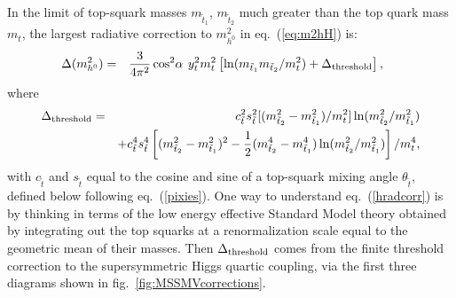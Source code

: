 \documentclass[12pt]{article}
\def\beq{\begin{eqnarray}}
\def\eeq{\end{eqnarray}}
\def\stilde{\widetilde}
\def\half{{1\over 2}}
\begin{document}
In the limit of top-squark
masses $m_{\stilde t_1}$, $m_{\stilde t_2}$ much greater than the top 
quark mass $m_t$, the largest radiative correction 
to $m_{h^0}^2$ in eq.~(\ref{eq:m2hH}) is:
\beq
\Delta (m^2_{h^0}) &=&
{3\over 4 \pi^2} \cos^2\!\alpha\>\, y_t^2 m_t^2
\left [
{\rm ln}(m_{\tilde t_1} m_{\tilde t_2} / m_t^2  )
+ \Delta_{\rm threshold} \right ], \phantom{xx}
\label{hradcorr}
\eeq
where 
\beq
\Delta_{\rm threshold} &=& 
c_{\tilde t}^2 s_{\tilde t}^2 [(m_{\tilde t_2}^2 - m_{\tilde t_1}^2)/m_t^2]
\, {\rm ln}(m_{\tilde t_2}^2/m_{\tilde t_1}^2) 
\nonumber
\\ 
&&
+ c_{\tilde t}^4 s_{\tilde t}^4 \left [
(m_{\tilde t_2}^2 - m_{\tilde t_1}^2)^2 - \half
(m_{\tilde t_2}^4 - m_{\tilde t_1}^4)
\, {\rm ln}(m_{\tilde t_2}^2/m_{\tilde t_1}^2) 
\right ]/m_t^4,
\label{eq:detDeltathreshold}
\eeq
with $c_{\tilde t}$ and $s_{\tilde t}$ equal to the cosine and sine of a top-squark mixing angle $\theta_{\tilde t}$, defined below following eq.~(\ref{pixies}).
One way to understand eq.~(\ref{hradcorr}) is by thinking in terms of the 
low energy effective Standard Model theory obtained by integrating out the top
squarks at a renormalization scale equal to the geometric mean of their masses.
Then 
$\Delta_{\rm threshold}$
comes from the finite threshold correction to the supersymmetric 
Higgs quartic coupling, via the first three
diagrams shown in fig.~\ref{fig:MSSMVcorrections}. 
\end{document}
